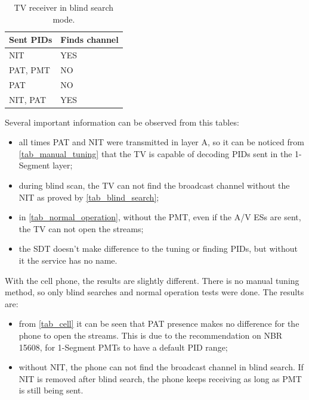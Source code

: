 \documentclass[
	12pt,				%
	openright,			%
	twoside,			%
	a4paper,			%
	brazil,
	french,				%
	english
	]{abntex2}
\begin{document}
\begin{table}
    \caption {TV receiver in blind search mode.}
    \begin{tabular}{|l|l|}
    \hline
    Sent PIDs & Finds channel \\ \hline
    NIT       & YES           \\ \hline
    PAT, PMT  & NO            \\ \hline
    PAT       & NO            \\ \hline
    NIT, PAT  & YES           \\ \hline
    \end{tabular}
	\label{tab_blind_search}
\end{table}

Several important information can be observed from this tables:
\begin{itemize}
\item all times PAT and NIT were transmitted in layer A, so it can be noticed from \autoref{tab_manual_tuning} that the TV is capable of decoding PIDs sent in the 1-Segment layer;
\item during blind scan, the TV can not find the broadcast channel without the NIT as proved by \autoref{tab_blind_search};
\item in \autoref{tab_normal_operation}, without the PMT, even if the A/V ESs are sent, the TV can not open the streams;
\item the SDT doesn't make difference to the tuning or finding PIDs, but without it the service has no name.
\end{itemize}


With the cell phone, the results are slightly different. There is no manual tuning method, so only blind searches and normal operation tests were done. The results are:

\begin{itemize}
\item from \autoref{tab_cell} it can be seen that PAT presence makes no difference for the phone to open the streams. This is due to the recommendation on NBR 15608, for 1-Segment PMTs to have a default PID range;
\item without NIT, the phone can not find the broadcast channel in blind search. If NIT is removed after blind search, the phone keeps receiving as long as PMT is still being sent.
\end{itemize}
\end{document}
